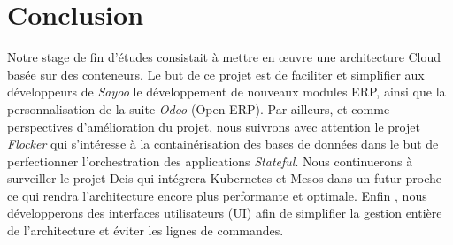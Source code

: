 \chapter*{Conclusion}

\begin{onehalfspace}
\initial
Notre stage de fin d’études consistait à mettre en œuvre une architecture Cloud basée sur des conteneurs. Le but de ce projet est de faciliter et simplifier aux développeurs de \emph{Sayoo} le développement de nouveaux modules ERP, ainsi que la personnalisation de la suite \emph{Odoo} (Open ERP).
\newline
\newline
\noindent Par ailleurs, et comme perspectives d'amélioration du projet, nous suivrons avec attention le projet \emph{Flocker} qui s'intéresse à la containérisation des bases de données dans le but de perfectionner l'orchestration des applications \emph{Stateful}. Nous continuerons à surveiller le projet Deis qui intégrera Kubernetes et Mesos dans un futur proche ce qui rendra l'architecture encore plus performante et optimale. Enfin , nous développerons des interfaces utilisateurs (UI) afin de simplifier la gestion entière de l'architecture et éviter les lignes de commandes.  	
\newline
\newline
\end{onehalfspace}